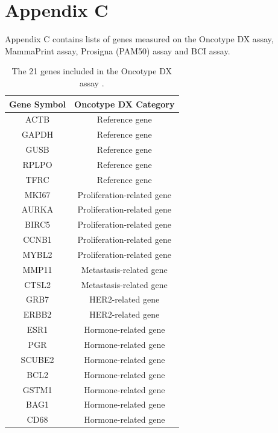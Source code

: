 \section*{Appendix C}
\renewcommand{\thefigure}{C\arabic{figure}}
\renewcommand{\thetable}{C\arabic{table}}
\setcounter{figure}{0}
\setcounter{table}{0}

{}


Appendix C contains lists of genes measured on the Oncotype DX assay, MammaPrint assay, Prosigna (PAM50) assay and BCI assay. 

{\normalsize
\begin{table}[!htb]
\caption{The 21 genes included in the Oncotype DX assay \citep{pmid15591335}.}
\center
\begin{tabular}{|c|c|}
\hline
\multicolumn{1}{|c|}{\textbf{Gene Symbol}} & \textbf{Oncotype DX Category} \\ 
\hline
ACTB & Reference gene  \\
GAPDH & Reference gene \\
GUSB & Reference gene \\
RPLPO & Reference gene \\ 
TFRC & Reference gene \\ 
\hline
MKI67 & Proliferation-related gene  \\
AURKA & Proliferation-related gene \\
BIRC5 & Proliferation-related gene \\
CCNB1 & Proliferation-related gene \\ 
MYBL2 & Proliferation-related gene \\ 
\hline 
MMP11 & Metastasis-related gene \\
CTSL2 & Metastasis-related gene \\ 
\hline 
GRB7 & HER2-related gene \\
ERBB2 & HER2-related gene \\  
\hline
ESR1 &  Hormone-related gene  \\
PGR & Hormone-related gene \\
SCUBE2 & Hormone-related gene \\
BCL2 & Hormone-related gene \\ 
GSTM1 & Hormone-related gene \\ 
BAG1 & Hormone-related gene \\
CD68 & Hormone-related gene \\
\hline
\end{tabular}
\label{Oncotype_DX_GS}
\end{table}
}


